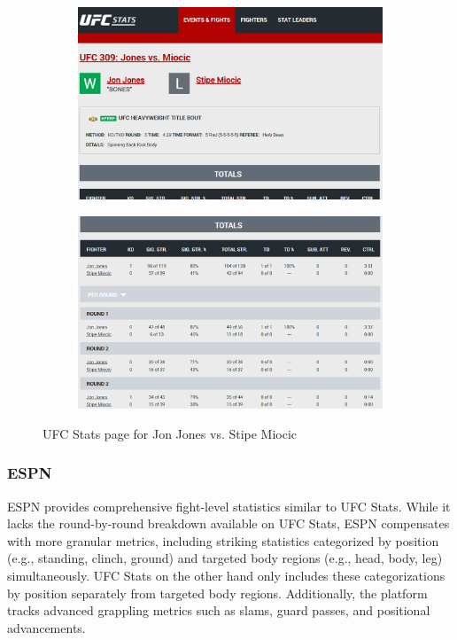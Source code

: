 \documentclass[12pt,twoside]{report}
\begin{document}
\begin{figure}[htb]
\centering
\begin{subfigure}{.5\linewidth}
  \centering
  \includegraphics[width=0.95\linewidth]{figures/ufcstats1.png}
\end{subfigure}%
\begin{subfigure}{.5\linewidth}
  \centering
  \includegraphics[width=0.95\linewidth]{figures/ufcstats2.png}
\end{subfigure}
\caption{UFC Stats page for Jon Jones vs. Stipe Miocic}
\end{figure}


\subsubsection{ESPN}

ESPN provides comprehensive fight-level statistics similar to UFC Stats. While it lacks the round-by-round breakdown available on UFC Stats, ESPN compensates with more granular metrics, including striking statistics categorized by position (e.g., standing, clinch, ground) and targeted body regions (e.g., head, body, leg) simultaneously. UFC Stats on the other hand only includes these categorizations by position separately from targeted body regions. Additionally, the platform tracks advanced grappling metrics such as slams, guard passes, and positional advancements. 
\end{document}
